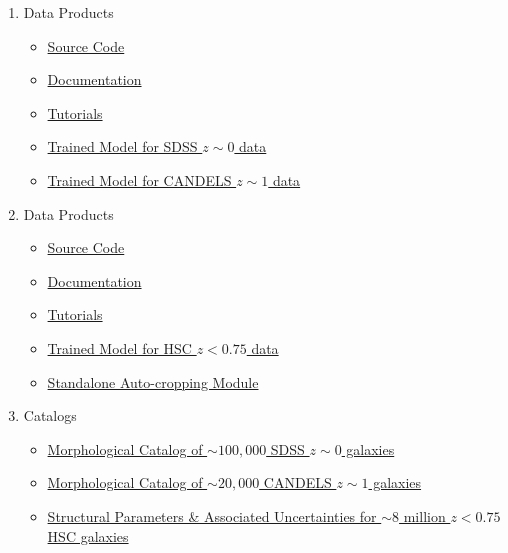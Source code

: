 \begin{enumerate}
    \setlength\itemsep{-0.1em}
    \item \gamornet{} Data Products
    \begin{itemize}
    \setlength\itemsep{-0.1em}
        \item \href{https://github.com/aritraghsh09/GaMorNet}{Source Code}
        \item \href{https://gamornet.readthedocs.io/en/latest/}{Documentation}
        \item \href{https://gamornet.readthedocs.io/en/latest/tutorials.html}{Tutorials}
        \item \href{https://gamornet.readthedocs.io/en/latest/usage_guide.html#trained-models}{Trained Model for SDSS $z\sim0$ data}
        \item \href{https://gamornet.readthedocs.io/en/latest/usage_guide.html#trained-models}{Trained Model for CANDELS $z\sim1$ data}
    \end{itemize}
    \item \gampen{} Data Products
        \begin{itemize}
        \setlength\itemsep{-0.1em}
            \item \href{https://github.com/aritraghsh09/GaMPEN}{Source Code}
            \item \href{https://gampen.readthedocs.io/en/latest/index.html}{Documentation}
            \item \href{https://gampen.readthedocs.io/en/latest/Tutorials.html}{Tutorials}
            \item \href{https://gampen.readthedocs.io/en/latest/Public_data.html}{Trained Model for HSC $z < 0.75$ data}
            \item \href{https://colab.research.google.com/github/aritraghsh09/GaMPEN/blob/master/tutorials/Autocropping.ipynb}{Standalone Auto-cropping Module}
        \end{itemize}
    \item Catalogs
    \begin{itemize}
    \setlength\itemsep{-0.1em}
        \item \href{https://gamornet.readthedocs.io/en/latest/usage_guide.html#prediction-tables}{Morphological Catalog of $\sim100,000$ SDSS $z\sim0$ galaxies}
        \item \href{https://gamornet.readthedocs.io/en/latest/usage_guide.html#prediction-tables}{Morphological Catalog of $\sim20,000$ CANDELS $z\sim1$ galaxies}
        \item \href{https://gampen.readthedocs.io/en/latest/Public_data.html#prediction-tables}{Structural Parameters \& Associated Uncertainties for $\sim8$ million $z <0.75$ HSC galaxies}
    \end{itemize}
\end{enumerate}

